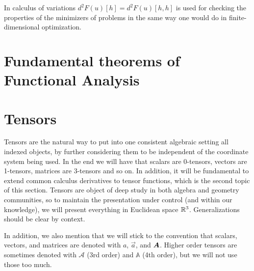 
In calculus of variations $d^2 F(u)[h] = d^2 F(u)[h,h]$ is used for checking the properties of the minimizers of problems in the same way one would do in finite-dimensional optimization.

\section{Fundamental theorems of Functional Analysis}\label{sec:fundamental-theorems-FA}

\section{Tensors}\label{sec:tensors}
Tensors are the natural way to put into one consistent algebraic setting all indexed objects, by further considering them to be independent of the coordinate system being used. In the end we will have that scalars are 0-tensors, vectors are 1-tensors, matrices are 3-tensors and so on. In addition, it will be fundamental to extend common calculus derivatives to tensor functions, which is the second topic of this section. Tensors are object of deep study in both algebra and geometry communities, so to maintain the presentation under control (and within our knowledge), we will present everything in Euclidean space $\mathbb{R}^3$. Generalizations should be clear by context. 

In addition, we also mention that we will stick to the convention that scalars, vectors, and matrices are denoted with $a$, $\vec a$, and $\mat A$. Higher order tensors are sometimes denoted with $\mathcal A$ (3rd order) and $\mathbb A$ (4th order), but we will not use those too much. 

